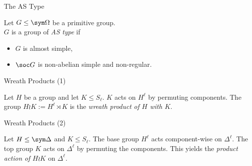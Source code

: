 \begin{frame}{The AS Type}
    \begin{defn}
        Let $G \leq \sym \Omega$ be a primitive group.
        \\
        $G$ is a group of \emph{AS type} if
        \vspace{-0.5em}
        \pause
        \begin{itemize}
            \item
            $G$ is almost simple,
            \pause
            \item
            $\soc G$ is non-abelian simple and non-regular.
        \end{itemize}
    \end{defn}
\end{frame}


\begin{frame}{Wreath Products (1)}
    \begin{defn}
        Let $H$ be a group and let $K \leq S_\ell$.
        $K$ acts on $H ^ \ell$ by permuting components.
        \pause
        The group
        $H \wr K := H ^ \ell \rtimes K$
        is the \emph{wreath product of $H$ with $K$}.
    \end{defn}
\end{frame}


\begin{frame}{Wreath Products (2)}
    \begin{defn}
        Let $H \leq \sym \Delta$ and $K \leq S_\ell$.
        The base group $H ^ \ell$ acts component-wise on $\Delta ^ \ell$.
        The top group $K$ acts on $\Delta ^ \ell$ by permuting the components.
        \pause
        This yields the \emph{product action of $H \wr K$} on $\Delta ^ \ell$.
    \end{defn}
\end{frame}

